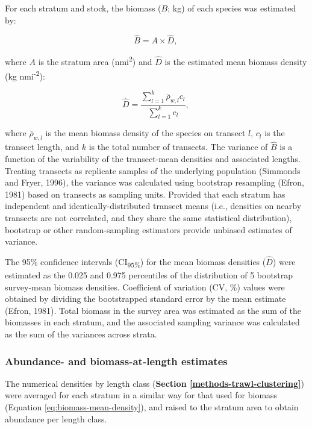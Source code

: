 \documentclass[]{article}
\begin{document}
For each stratum and stock, the biomass (\(B\); kg) of each species was estimated by:

\begin{equation}
  \hat{B} = A \times \hat{D}\text{, }
  \label{eq:biomass-mean}
\end{equation}

where \(A\) is the stratum area (nmi\textsuperscript{2}) and \(\hat{D}\) is the estimated mean biomass density (kg nmi\textsuperscript{-2}):

\begin{equation}
  \hat{D} = \frac{\sum_{l=1}^{k}\overline{\rho}_{w,l} c_l}{\sum_{l=1}^{k}c_l}\text{, }
  \label{eq:biomass-mean-density}
\end{equation}

where \(\overline{\rho}_{w,l}\) is the mean biomass density of the species on transect \(l\), \(c_l\) is the transect length, and \(k\) is the total number of transects. The variance of \(\hat{B}\) is a function of the variability of the transect-mean densities and associated lengths. Treating transects as replicate samples of the underlying population (Simmonds and Fryer, 1996), the variance was calculated using bootstrap resampling (Efron, 1981) based on transects as sampling units. Provided that each stratum has independent and identically-distributed transect means (i.e., densities on nearby transects are not correlated, and they share the same statistical distribution), bootstrap or other random-sampling estimators provide unbiased estimates of variance.

The 95\% confidence intervals (CI\textsubscript{95\%}) for the mean biomass densities (\(\hat{D}\)) were estimated as the 0.025 and 0.975 percentiles of the distribution of 5 bootstrap survey-mean biomass densities. Coefficient of variation (CV, \%) values were obtained by dividing the bootstrapped standard error by the mean estimate (Efron, 1981). Total biomass in the survey area was estimated as the sum of the biomasses in each stratum, and the associated sampling variance was calculated as the sum of the variances across strata.

\hypertarget{methods-abundance-at-length}{%
\subsubsection{Abundance- and biomass-at-length estimates}\label{methods-abundance-at-length}}

The numerical densities by length class (\textbf{Section \ref{methods-trawl-clustering}}) were averaged for each stratum in a similar way for that used for biomass (Equation \eqref{eq:biomass-mean-density}), and raised to the stratum area to obtain abundance per length class.
\end{document}
